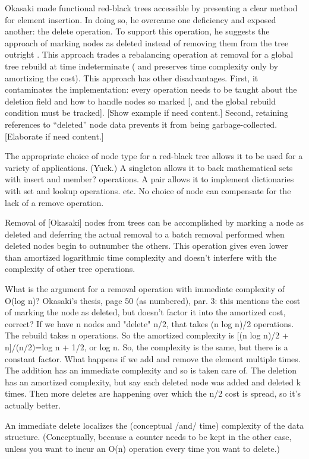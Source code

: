 \documentclass[preprint]{sigplanconf}
\begin{document}
Okasaki \cite{okasaki1999functional} made functional red-black trees accessible by presenting a clear method for element insertion. In doing so, he overcame one deficiency and exposed another: the delete operation. To support this operation, he suggests the approach of marking nodes as deleted instead of removing them from the tree outright \cite[p. 50]{okasaki1996purely}. This approach trades a rebalancing operation at removal for a global tree rebuild at time indeterminate ( and preserves time complexity only by amortizing the cost). This approach has other disadvantages. First, it contaminates the implementation: every operation needs to be taught about the deletion field and how to handle nodes so marked [, and the global rebuild condition must be tracked]. [Show example if need content.] Second, retaining references to ``deleted'' node data prevents it from being garbage-collected. [Elaborate if need content.]


The appropriate choice of node type for a red-black tree allows it to be used for a variety of applications. (Yuck.) A singleton allows it to back mathematical sets with insert and member? operations. A pair allows it to implement dictionaries with set and lookup operations. etc. No choice of node can compensate for the lack of a remove operation.

Removal of [Okasaki] nodes from trees can be accomplished by marking a node as deleted and deferring the actual removal to a batch removal performed when deleted nodes begin to outnumber the others. This operation gives even lower than amortized logarithmic time complexity and doesn't interfere with the complexity of other tree operations.

What is the argument for a removal operation with immediate complexity of O(log n)?
Okasaki's thesis, page 50 (as numbered), par. 3: this mentions the cost of marking the node as deleted, but doesn't factor it into the amortized cost, correct? If we have n nodes and "delete" n/2, that takes (n log n)/2 operations. The rebuild takes n operations. So the amortized complexity is [(n log n)/2 + n]/(n/2)=log n + 1/2, or log n. So, the complexity is the same, but there is a constant factor. What happens if we add and remove the element multiple times. The addition has an immediate complexity and so is taken care of. The deletion has an amortized complexity, but say each deleted node was added and deleted k times. Then more deletes are happening over which the n/2 cost is spread, so it's actually better.

An immediate delete localizes the (conceptual /and/ time) complexity of the data structure. (Conceptually, because a counter needs to be kept in the other case, unless you want to incur an O(n) operation every time you want to delete.)
\end{document}
